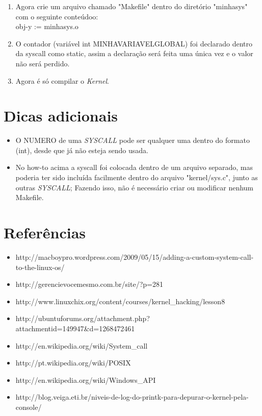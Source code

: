 \documentclass[12pt]{article}
\begin{document}
\begin{enumerate}
\begin{itemize}
\end{itemize}

\item Agora crie um arquivo chamado "Makefile" dentro do diretório "minhasys"
com o seguinte conteúdoo:\\
obj-y := minhasys.o

\item O contador (variável int MINHAVARIAVELGLOBAL) foi declarado dentro da syscall como static, assim a declaração será feita uma única vez e o valor não será perdido.

\item Agora é só compilar o \textit{Kernel}.

\end{enumerate}

\section{Dicas adicionais}

\begin{itemize}

	\item O NUMERO de uma \textit{SYSCALL} pode ser qualquer uma dentro do formato (int), desde que já não esteja sendo usada.
	\item No how-to acima a syscall foi colocada dentro de um arquivo separado, mas poderia ter sido incluída facilmente dentro do arquivo "kernel/sys.c", junto as outras \textit{SYSCALL}; Fazendo isso, não é necessário criar ou modificar nenhum Makefile.

\end{itemize}

\section{Referências}

\begin{itemize}

	\item http://macboypro.wordpress.com/2009/05/15/adding-a-custom-system-call-to-the-linux-os/
	\item http://gerencievocemesmo.com.br/site/?p=281
	\item http://www.linuxchix.org/content/courses/kernel\_hacking/lesson8
	\item http://ubuntuforums.org/attachment.php?attachmentid=149947\&d=1268472461
	\item http://en.wikipedia.org/wiki/System\_call
	\item http://pt.wikipedia.org/wiki/POSIX
	\item http://en.wikipedia.org/wiki/Windows\_API
	\item http://blog.veiga.eti.br/niveis-de-log-do-printk-para-depurar-o-kernel-pela-console/

\end{itemize}
\end{document}
